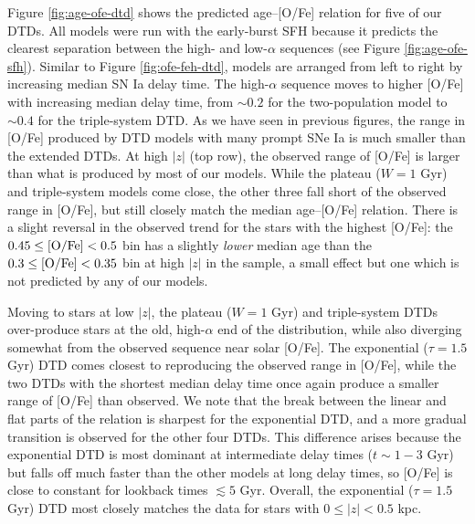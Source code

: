 \documentclass[twocolumn,twocolappendix,linenumbers]{aastex631}
\begin{document}
Figure \ref{fig:age-ofe-dtd} shows the predicted age--[O/Fe] relation for five of our DTDs. All models were run with the early-burst SFH because it predicts the clearest separation between the high- and low-$\alpha$ sequences (see Figure \ref{fig:age-ofe-sfh}). Similar to Figure \ref{fig:ofe-feh-dtd}, models are arranged from left to right by increasing median SN Ia delay time. The high-$\alpha$ sequence moves to higher [O/Fe] with increasing median delay time, from $\sim0.2$ for the two-population model to $\sim0.4$ for the triple-system DTD. As we have seen in previous figures, the range in [O/Fe] produced by DTD models with many prompt SNe Ia is much smaller than the extended DTDs. At high $|z|$ (top row), the observed range of [O/Fe] is larger than what is produced by most of our models. While the plateau ($W=1$ Gyr) and triple-system models come close, the other three fall short of the observed range in [O/Fe], but still closely match the median age--[O/Fe] relation. There is a slight reversal in the observed trend for the stars with the highest [O/Fe]: the $0.45\leq{\rm [O/Fe]}<0.5$ bin has a slightly \textit{lower} median age than the $0.3\leq{\rm [O/Fe]}<0.35$ bin at high $|z|$ in the  sample, a small effect but one which is not predicted by any of our models.

Moving to stars at low $|z|$, the plateau ($W=1$ Gyr) and triple-system DTDs over-produce stars at the old, high-$\alpha$ end of the distribution, while also diverging somewhat from the observed sequence near solar [O/Fe]. The exponential ($\tau=1.5$ Gyr) DTD comes closest to reproducing the observed range in [O/Fe], while the two DTDs with the shortest median delay time once again produce a smaller range of [O/Fe] than observed. We note that the break between the linear and flat parts of the relation is sharpest for the exponential DTD, and a more gradual transition is observed for the other four DTDs. This difference arises because the exponential DTD is most dominant at intermediate delay times ($t\sim 1-3$ Gyr) but falls off much faster than the other models at long delay times, so [O/Fe] is close to constant for lookback times $\lesssim 5$ Gyr. Overall, the exponential ($\tau=1.5$ Gyr) DTD most closely matches the data for stars with $0\leq|z|<0.5$ kpc.
\end{document}
